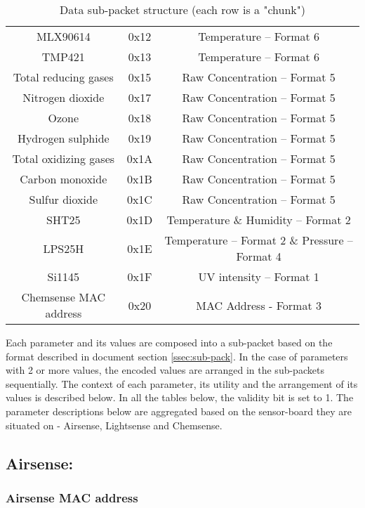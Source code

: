 \begin{table}[H]
{\begin{tabular}{|c|c|c|}
        MLX90614 & 0x12 & Temperature -- Format 6\\
        TMP421 & 0x13 & Temperature -- Format 6\\
        Total reducing gases & 0x15 & Raw Concentration -- Format 5\\
        Nitrogen dioxide & 0x17 & Raw Concentration -- Format 5\\
        Ozone & 0x18 & Raw Concentration -- Format 5\\
        Hydrogen sulphide & 0x19 & Raw Concentration -- Format 5\\
        Total oxidizing gases & 0x1A & Raw Concentration -- Format 5\\
        Carbon monoxide & 0x1B & Raw Concentration -- Format 5\\
        Sulfur dioxide & 0x1C & Raw Concentration -- Format 5\\
        SHT25 & 0x1D & Temperature \& Humidity -- Format 2\\
        LPS25H & 0x1E & Temperature -- Format 2 \& Pressure -- Format 4\\
        Si1145 & 0x1F & UV intensity -- Format 1\\
        Chemsense MAC address & 0x20 & MAC Address - Format 3\\
        \hline
    \end{tabular}
    }
    \caption{Data sub-packet structure (each row is a "chunk")}
    \label{tab:dataChunk}
\end{table}

Each parameter and its values are composed into a sub-packet based on
the format described in document section \ref{ssec:sub-pack}.
In the case of parameters with 2 or more values, the encoded values are
arranged in the sub-packets sequentially. The context of each parameter,
its utility and the arrangement of its values is described below. In all
the tables below, the validity bit is set to 1. The parameter descriptions
below are aggregated based on the sensor-board they are situated on -
Airsense, Lightsense and Chemsense.

\subsection{Airsense:}
\subsubsection{ Airsense MAC address} \label{ssec:first}

